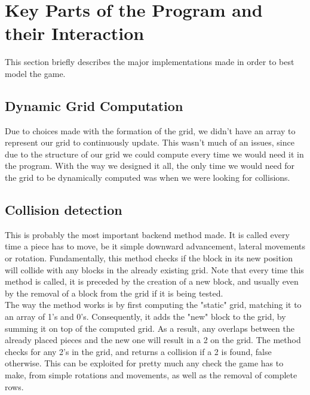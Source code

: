 
\section{Key Parts of the Program and their Interaction}
	This section briefly describes the major implementations made in order to best model the game.
	\subsection{Dynamic Grid Computation}
		Due to choices made with the formation of the grid, we didn't have an array to represent our grid to continuously update. This wasn't much of an issues, since due to the 
		structure of our grid we could compute every time we would need it in the program. With the way we designed it all, the only time we would need for the grid to be dynamically 
		computed was when we were looking for collisions.
	\subsection{Collision detection}
		This is probably the most important backend method made. It is called every time a piece has to move, be it simple downward advancement, lateral movements or rotation. Fundamentally,
		this method checks if the block in its new position will collide with any blocks in the already existing grid. Note that every time this method is called, it is preceded by the creation of a new 
		block, and usually even by the removal of a block from the grid if it is being tested. \\
		The way the method works is by first computing the "static" grid, matching it to an array of 1's and 0's. Consequently, it adds the "new" block to the grid, by summing it on top of the
		computed grid. As a result, any overlaps between the already placed pieces and the new one will result in a 2 on the grid. The method checks for any 2's in the grid, and returns a collision
		if a 2 is found, false otherwise. This can be exploited for pretty much any check the game has to make, from simple rotations and movements, as well as the removal of complete rows.
